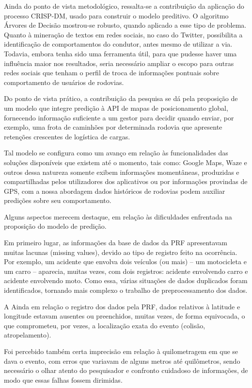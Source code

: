 Ainda do ponto de vista metodológico, ressalta-se a contribuição da aplicação do processo CRISP-DM,
usado para construir o modelo preditivo. 
O algoritmo Árvores de Decisão mostrou-se robusto, quando aplicado a esse tipo de problema.
Quanto à mineração de textos em redes sociais, no caso do Twitter, possibilita a identificação de comportamentos do condutor, antes mesmo de utilizar a via. Todavia, embora tenha sido uma ferramenta útil, para que pudesse haver uma influência maior nos resultados, seria necessário ampliar o escopo para outras redes sociais que tenham o perfil de troca de informações pontuais sobre comportamento de usuários de rodovias.

Do ponto de vista prático, a contribuição da pesquisa se dá pela proposição de um modelo que integre predição à
API de mapas de posicionamento global, fornecendo informação suficiente a um gestor para decidir quando enviar,
por exemplo, uma frota de caminhões por determinada rodovia que apresente retenções crescentes de logística de cargas.

Tal modelo se configura como um avanço em relação às funcionalidades das soluções disponíveis que existem até o momento, tais como: Google Maps, Waze e outros dessa natureza somente exibem informações momentâneas, produzidas e compartilhadas pelos utilizadores dos aplicativos ou por informações provindas de GPS, com a nossa abordagem dados históricos de rodovias podem auxiliar predições sobre seu comportamento.

Alguns aspectos merecem destaque, em relação às dificuldades enfrentada na proposição do modelo de predição.

Em primeiro lugar, as informações da base de dados da PRF apresentavam muitas lacunas (missing values), devido ao tipo de registro feito na ocorrência. Por exemplo, um acidente que envolva dois veículos (ou mais) -- um motocicleta e um carro -- aparecia, muitas vezes, com dois registros: acidente envolvendo carro e acidente envolvendo moto. Como essa, várias situações de dados duplicados foram identificados, tornando mais complexo o trabalho de preprocessamento dos dados.

A Ainda em relação o registro dos dados pela PRF, dados relativos à latitude e longitude estavam ausentes ou preenchidos, muitas vezes, de forma equivocada, o que comprometeu, por vezes, a localização exata do evento (colisão, atropelamento).

Foi percebido também certa imprecisão em relação à quilometragem em que se dava o evento, com erros que variavam de alguns metros até quilômetros, sendo necessário o olhar atento do pesquisador e confronto cuidadoso de informações, de modo que essas falhas fossem dirimidas.

